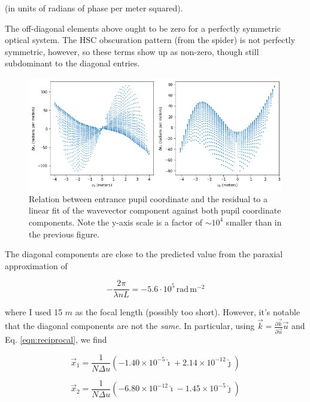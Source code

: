 \documentclass{article}
\begin{document}
(in units of radians of phase per meter squared).

The off-diagonal elements above ought to be zero for a perfectly symmetric optical system.  The HSC
obscuration pattern (from the spider) is not perfectly symmetric, however, so these terms show up as
non-zero, though still subdominant to the diagonal entries.

\begin{figure}
    \includegraphics[scale=0.7]{dku.png}

    \caption{Relation between entrance pupil coordinate and the residual to a linear fit of the
    wavevector component against both pupil coordinate components.  Note the y-axis scale is a
    factor of $\sim 10^4$ smaller than in the previous figure.}

    \label{fig:dku}
\end{figure}

The diagonal components are close to the predicted value from the paraxial approximation of

\begin{equation}
    -\frac{2 \pi}{\lambda n L} = -5.6 \cdot 10^5 \mathrm{\,rad\,m^{-2}}
\end{equation}

where I used 15 $m$ as the focal length (possibly too short).  However, it's notable that the
diagonal components are not the \textit{same}.  In particular, using $\vec{k} = \frac{\partial
\vec{k}}{\partial \vec{u}} \vec{u}$ and Eq. \ref{eqn:reciprocal}, we find

\begin{equation}
    \vec{x}_1 = \frac{1}{N \Delta u} (-1.40 \times 10^{-5} \hat{\imath} + 2.14 \times 10^{-12} \hat{\jmath})
\end{equation}

\begin{equation}
    \vec{x}_2 = \frac{1}{N \Delta u} (-6.80 \times 10^{-12} \hat{\imath} - 1.45 \times 10^{-5} \hat{\jmath})
\end{equation}
\end{document}
